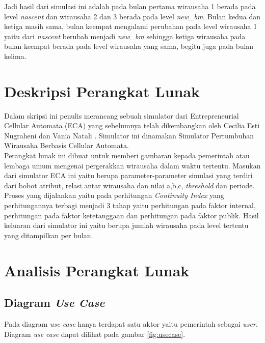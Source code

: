 Jadi hasil dari simulasi ini adalah pada bulan pertama wirausaha 1 berada pada level \textit{nascent} dan wirausaha 2 dan 3 berada pada level \textit{new\_bm}. Bulan kedua dan ketiga masih sama, bulan keempat mengalami perubahan pada level wirausaha 1 yaitu dari \textit{nascent} berubah menjadi \textit{new\_bm} sehingga ketiga wirausaha pada bulan keempat berada pada level wirausaha yang sama, begitu juga pada bulan kelima.
	
\section{Deskripsi Perangkat Lunak}
\label{dpl}

Dalam skripsi ini penulis merancang sebuah simulator dari Entrepreneurial Cellular Automata (ECA) yang sebelumnya telah dikembangkan oleh Cecilia Esti Nugraheni dan Vania Natali \cite{ECA}. Simulator ini dinamakan Simulator Pertumbuhan Wirausaha Berbasis Cellular Automata.\\
Perangkat lunak ini dibuat untuk memberi gambaran kepada pemerintah atau lembaga umum mengenai pergerakkan wirausaha dalam waktu tertentu. Masukan dari simulator ECA ini yaitu berupa parameter-parameter simulasi yang terdiri dari bobot atribut, relasi antar wirausaha dan nilai a,b,c, \textit{threshold} dan periode. Proses yang dijalankan yaitu pada perhitungan \textit{Continuity Index} yang perhitungannya terbagi menjadi 3 tahap yaitu perhitungan pada faktor internal, perhitungan pada faktor ketetanggaan dan perhitungan pada faktor publik. Hasil keluaran dari simulator ini yaitu berupa jumlah wirausaha pada level tertentu yang ditampilkan per bulan.


\section{Analisis Perangkat Lunak}
\label{analisisPL}

\subsection{Diagram \textit{Use Case}}

Pada diagram \textit{use case} hanya terdapat satu aktor yaitu pemerintah sebagai \textit{user}. Diagram \textit{use case} dapat dilihat pada gambar \ref{fig:usecase}.

